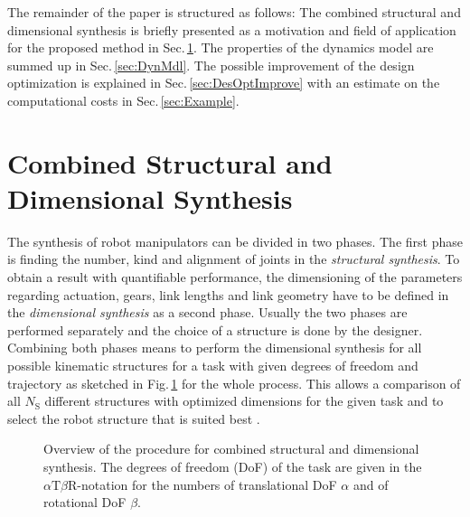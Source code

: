 \documentclass{svproc}
\begin{document}
The remainder of the paper is structured as follows:
The combined structural and dimensional synthesis is briefly presented as a motivation and field of application for the proposed method in Sec.\,\ref{sec:DimSynth}.
The properties of the dynamics model are summed up in Sec.\,\ref{sec:DynMdl}.
The possible improvement of the design optimization is explained in Sec.\,\ref{sec:DesOptImprove} with an estimate on the computational costs in Sec.\,\ref{sec:Example}.

\section{Combined Structural and Dimensional Synthesis}
\label{sec:DimSynth}

The synthesis of robot manipulators can be divided in two phases.
The first phase is finding the number, kind and alignment of joints in the \emph{structural synthesis}.
To obtain a result with quantifiable performance, the dimensioning of the parameters regarding actuation, gears, link lengths and link geometry have to be defined in the \emph{dimensional synthesis} as a second phase.
Usually the two phases are performed separately and the choice of a structure is done by the designer.
Combining both phases means to perform the dimensional synthesis for all possible kinematic structures for a task with given degrees of freedom and trajectory as  sketched in Fig.\,\ref{fig:structdimsynth} for the whole process.
This allows a comparison of all $N_{\mathrm{S}}$ different structures with optimized dimensions for the given task and to select the robot structure that is suited best \cite{RamirezKotOrt2015,RamirezKotOrt2017}.


\begin{figure}[tb]
	
	\caption{Overview of the procedure for combined structural and dimensional synthesis. The degrees of freedom (DoF) of the task are given in the $\alpha\mathrm{T}\beta\mathrm{R}$-notation for the numbers of translational DoF  $\alpha$ and of rotational DoF $\beta$.}
	\label{fig:structdimsynth}
\end{figure} 
\end{document}
